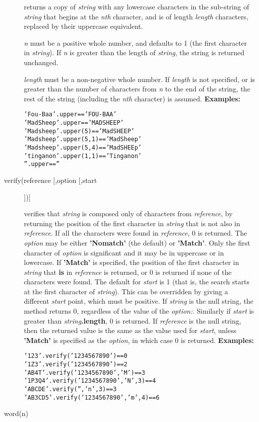 \begin{description}
returns a copy of \emph{string} with any lowercase characters in
the sub-string of \emph{string} that begins at the \emph{n}\emph{th}
character, and is of length \emph{length} characters, replaced by
their uppercase equivalent.
 
\emph{n} must be a positive whole number, and defaults to 1 (the
first character in \emph{string}).  If \emph{n} is greater than
the length of \emph{string}, the string is returned unchanged.
 
\emph{length} must be a non-negative whole number.
If \emph{length} is not specified, or is greater than the number of
characters from \emph{n} to the end of the string, the rest of the
string (including the \emph{n}\emph{th} character) is assumed.
 \textbf{Examples:}
\begin{alltt}
'Fou-Baa'.upper        == 'FOU-BAA'
'Mad Sheep'.upper      == 'MAD SHEEP'
'Mad sheep'.upper(5)   == 'Mad SHEEP'
'Mad sheep'.upper(5,1) == 'Mad Sheep'
'Mad sheep'.upper(5,4) == 'Mad SHEEp'
'tinganon'.upper(1,1)  == 'Tinganon'
''.upper               == ''
\end{alltt}
\item[verify(reference [,option [,start]])]\label{refverify}

verifies that \emph{string} is composed only of characters
from \emph{reference}, by returning the position of the first
character in \emph{string} that is not also in
\emph{reference}.  If all the characters were found in
\emph{reference}, 0 is returned.
 The \emph{option} may be either \textbf{'Nomatch'} (the
default) or \textbf{'Match'}.  Only the first character of
\emph{option} is significant and it may be in uppercase or in
lowercase.
If \textbf{'Match'} is specified, the position of the first character
in \emph{string} that \textbf{is} in \emph{reference} is
returned, or 0 is returned if none of the characters were found.
 The default for \emph{start} is 1 (that is, the search starts at
the first character of \emph{string}).
This can be overridden by giving a different \emph{start} point,
which must be positive.
 If \emph{string} is the null string, the method returns 0,
regardless of the value of the \emph{option:}.
Similarly if \emph{start} is greater than
\emph{string}\textbf{.length}, 0 is returned.
 If \emph{reference} is the null string, then the returned value
is the same as the value used for \emph{start},
unless \textbf{'Match'} is specified as the \emph{option}, in
which case 0 is returned.
 \textbf{Examples:}
\begin{alltt}
'123'.verify('1234567890')          == 0
'1Z3'.verify('1234567890')          == 2
'AB4T'.verify('1234567890','M')     == 3
'1P3Q4'.verify('1234567890','N',3)  == 4
'ABCDE'.verify('','n',3)            == 3
'AB3CD5'.verify('1234567890','m',4) == 6
\end{alltt}
\item[word(n)]\label{refword}


\end{description}
